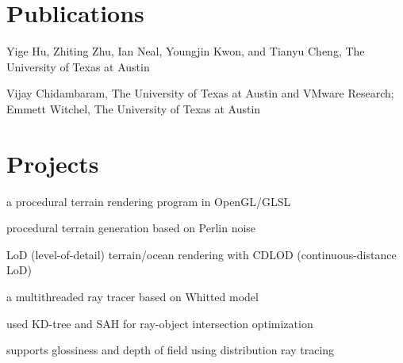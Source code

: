 \documentclass[]{deedy-resume-openfont}
\begin{document}
\begin{minipage}[t]{0.66\textwidth}


\section{Publications}

\begin{tightemize}
\item Yige Hu, Zhiting Zhu, Ian Neal, Youngjin Kwon, and Tianyu Cheng, The University of Texas at Austin
\item Vijay Chidambaram, The University of Texas at Austin and VMware Research; Emmett Witchel, The University of Texas at Austin
\end{tightemize}
\sectionsep


\section{Projects}

\begin{tightemize}
\item a procedural terrain rendering program in OpenGL/GLSL
\item procedural terrain generation based on Perlin noise
\item LoD (level-of-detail) terrain/ocean rendering with CDLOD (continuous-distance LoD)
\end{tightemize}
\sectionsep

\begin{tightemize}
\item a multithreaded ray tracer based on Whitted model
\item used KD-tree and SAH for ray-object intersection optimization
\item supports glossiness and depth of field using distribution ray tracing
\end{tightemize}
\sectionsep


\end{minipage}
\end{document}
